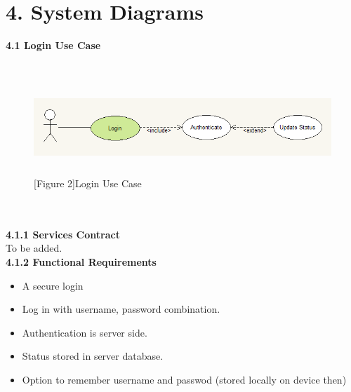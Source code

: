 \documentclass[29pt,a4paper]{moderncv}
\begin{document}
	\section*{\textbf{4. System Diagrams}}
	\vspace{2mm}
	 \left\textbf{4.1 Login Use Case}\\
		\\ \begin{figure}
			\centering
			\\ \includegraphics[width=5.8in, height=1.1in]{./loginCase.png}
			\\\caption{[Figure 2]Login Use Case}
		\end{figure}\\
	
		\\ \noindent\textbf{4.1.1 Services Contract}\\
		To be added.\\
		
		\noindent\textbf{4.1.2 Functional Requirements}
			\begin{itemize}
				\item A secure login
				\item Log in with username, password combination.
				\item Authentication is server side.
				\item Status stored in server database.
				\item Option to remember username and passwod (stored locally on device then)\\			
			\end{itemize}
			
\end{document}
